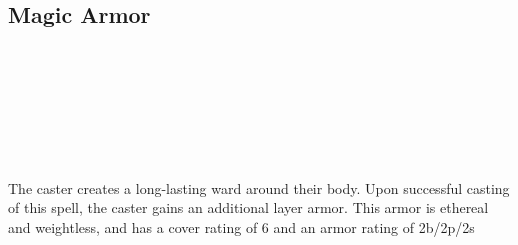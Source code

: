 \subsection*{Magic Armor}
 \\
 \\
 \\
 \\
 \\
 \\

The caster creates a long-lasting ward around their body. Upon
successful casting of this spell, the caster gains an additional layer
armor. This armor is ethereal and weightless, and has a cover rating of
6 and an armor rating of 2b/2p/2s
